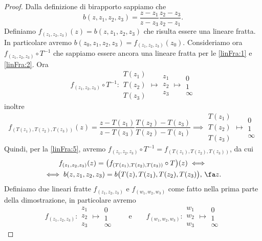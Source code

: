 \begin{proof}
	\graffito{\(\Rightarrow)\)}Dalla definizione di birapporto sappiamo che
	\[
		b(z,z_1,z_2,z_3) = \frac{z-z_1}{z-z_3}\frac{z_2-z_3}{z_2-z_1}.
	\]
	Definiamo \(f_{(z_1,z_2,z_3)}(z)=b(z,z_1,z_2,z_3)\) che risulta essere una lineare fratta.
	In particolare avremo \(b(z_0,z_1,z_2,z_3) = f_{(z_1,z_2,z_3)}(z_0)\).
	Consideriamo ora \(f_{(z_1,z_2,z_3)} \circ T^{-1}\) che sappiamo essere ancora una lineare fratta per le \autoref{linFra:1} e \autoref{linFra:2}.
	Ora
	\[
		f_{(z_1,z_2,z_3)} \circ T^{-1}\colon \begin{matrix}T(z_1)\\T(z_2)\\T(z_3)\end{matrix} \mapsto \begin{matrix}z_1\\z_2\\z_3\end{matrix} \mapsto \begin{matrix}0\\1\\\infty\end{matrix}
	\]
	inoltre
	\[
		f_{(T(z_1),T(z_2),T(z_3))}(z) = \frac{z-T(z_1)}{z-T(z_3)}\frac{T(z_2)-T(z_3)}{T(z_2)-T(z_1)} \implies \begin{matrix}T(z_1)\\T(z_2)\\T(z_3)\end{matrix} \mapsto \begin{matrix}0\\1\\\infty\end{matrix}
	\]
	Quindi, per la \autoref{linFra:5}, avremo \(f_{(z_1,z_2,z_3)} \circ T^{-1} = f_{(T(z_1),T(z_2),T(z_3))}\), da cui
	\begin{multline*}
		f_{(z_1,z_2,z_3)}(z) = \big(f_{(T(z_1),T(z_2),T(z_3))}\circ T\big)(z) \iff\\
		\iff b(z,z_1,z_2,z_3) = b\big(T(z),T(z_1),T(z_2),T(z_3)\big),\,\fa z.
	\end{multline*}
	\graffito{\(\Leftarrow)\)}Definiamo due lineari fratte \(f_{(z_1,z_2,z_3)}\) e \(f_{(w_1,w_2,w_3)}\) come fatto nella prima parte della dimostrazione, in particolare avremo
	\[
		f_{(z_1,z_2,z_3)}\colon \begin{matrix}z_1\\z_2\\z_3\end{matrix} \mapsto \begin{matrix}0\\1\\\infty\end{matrix} \qquad\text{e}\qquad f_{(w_1,w_2,w_3)}\colon \begin{matrix}w_1\\w_2\\w_3\end{matrix} \mapsto \begin{matrix}0\\1\\\infty\end{matrix}
\]
\end{proof}
